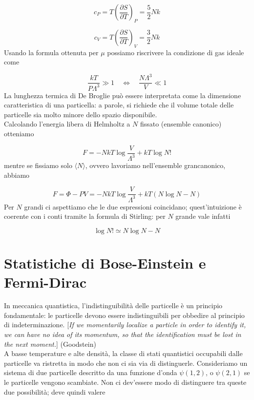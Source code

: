 \documentclass[a4paper]{report}
\begin{document}
\begin{equation}
    c_P = T \left(\frac{\partial S}{\partial T}\right)_P = \frac{5}{2} N k
\end{equation}

\begin{equation}
    c_V = T \left(\frac{\partial S}{\partial T}\right)_V = \frac{3}{2} N k
\end{equation}
Usando la formula ottenuta per $\mu$ possiamo riscrivere la condizione di gas ideale come

\begin{equation}
    \frac{k T}{P \Lambda^3} \gg 1 \quad \iff \quad \frac{N \Lambda^3}{V} \ll 1 
\end{equation}
La lunghezza termica di De Broglie può essere interpretata come la dimensione caratteristica di una particella: a parole, si richiede che il volume totale delle particelle sia molto minore dello spazio disponibile.\\
Calcolando l'energia libera di Helmholtz a $N$ fissato (ensemble canonico) otteniamo

\begin{equation}
    F = - N k T \log \frac{V}{\Lambda^3} + k T \log N! 
\end{equation}
mentre se fissiamo solo $\langle N \rangle$, ovvero lavoriamo nell'ensemble grancanonico, abbiamo

\begin{equation}
    F = \Phi - PV = - N k T \log \frac{V}{\Lambda^3} + k T \left(N\log N - N\right)
\end{equation}
Per $N$ grandi ci aspettiamo che le due espressioni coincidano; quest'intuizione è coerente con i conti tramite la formula di Stirling: per $N$ grande vale infatti 

\begin{equation}
\log N! \simeq N\log N - N
\end{equation}

\section{Statistiche di Bose-Einstein e Fermi-Dirac}

In meccanica quantistica, l'indistinguibilità delle particelle è un principio fondamentale: le particelle devono essere indistinguibili per obbedire al principio di indeterminazione. [\textit{If we momentarily localize a particle in order to identify it, we can have no idea of its momentum, so that the identification must be lost in the next moment.}] (Goodstein)\\
A basse temperature e alte densità, la classe di stati quantistici occupabili dalle particelle va ristretta in modo che non ci sia via di distinguerle. Consideriamo un sistema di due particelle descritto da una funzione d'onda $\psi(1,2)$, o $\psi(2,1)$ se le particelle vengono scambiate. Non ci dev'essere modo di distinguere tra queste due possibilità; deve quindi valere
\end{document}
